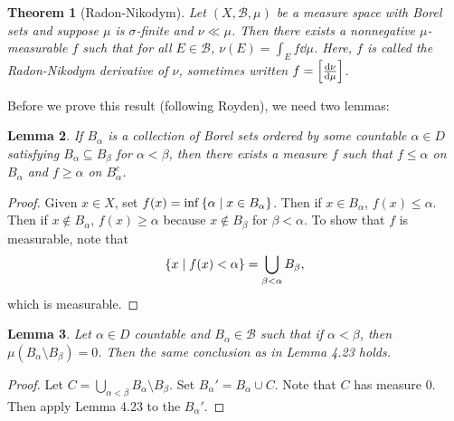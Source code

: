 \documentclass[leqno, openany]{memoir}
\newtheorem{thm}{Theorem}[chapter]
\newtheorem{lem}[thm]{Lemma}
\theoremstyle{definition}
\theoremstyle{remark}
\theoremstyle{plain}
\theoremstyle{definition}
\theoremstyle{remark}
\newcommand{\mc}[1]{\mathcal{#1}}
\begin{document}
\begin{thm}[Radon-Nikodym]
    Let $(X, \mc{B}, \mu)$ be a measure space with Borel sets and suppose $\mu$ is $\sigma$-finite and $\nu \ll \mu$. Then there exists a nonnegative $\mu$-measurable $f$ such that for all $E \in \mc{B}$, $\nu(E) = \int_E f \dd{\mu}$. Here, $f$ is called the \textit{Radon-Nikodym derivative of $\nu$}, sometimes written $f = \qty[\dv{\nu}{\mu}]$. 
\end{thm}

Before we prove this result (following Royden), we need two lemmas:

\begin{lem}
    If $B_{\alpha}$ is a collection of Borel sets ordered by some countable $\alpha \in D$ satisfying $B_{\alpha} \subseteq B_{\beta}$ for $\alpha < \beta$, then there exists a measure $f$ such that $f \leq \alpha$ on $B_{\alpha}$ and $f \geq \alpha$ on $B_{\alpha}^c$.
\end{lem}

\begin{proof}
    Given $x \in X$, set $f(x) = \inf \qty{\alpha \mid x \in B_{\alpha}}$. Then if $x \in B_{\alpha}$, $f(x) \leq \alpha$. Then if $x \notin B_{\alpha}$, $f(x) \geq \alpha$ because $x \notin B_{\beta}$ for $\beta < \alpha$. To show that $f$ is measurable, note that 
    \[ \qty{x \mid f(x) < \alpha} = \bigcup_{\beta < \alpha} B_{\beta}, \]
    which is measurable.
\end{proof}

\begin{lem}
    Let $\alpha \in D$ countable and $B_{\alpha} \in \mc{B}$ such that if $\alpha < \beta$, then $\mu(B_{\alpha} \setminus B_{\beta}) = 0$. Then the same conclusion as in Lemma 4.23 holds.
\end{lem}

\begin{proof}
    Let $C = \bigcup_{\alpha < \beta} B_{\alpha} \setminus B_{\beta}$. Set $B_{\alpha}' = B_{\alpha} \cup C$. Note that $C$ has measure $0$. Then apply Lemma 4.23 to the $B_{\alpha}'$.
\end{proof}
\end{document}
